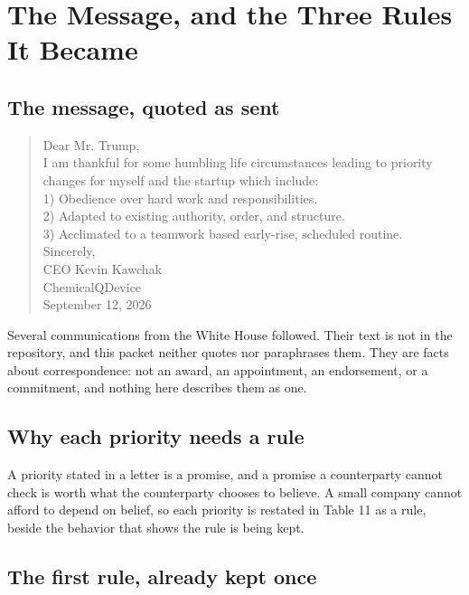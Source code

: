 \section{The Message, and the Three Rules It Became}

\subsection{The message, quoted as sent}

\begin{quote}\small
Dear Mr. Trump,\\[0.4em]
I am thankful for some humbling life circumstances leading to priority changes
for myself and the startup which include:\\
1) Obedience over hard work and responsibilities.\\
2) Adapted to existing authority, order, and structure.\\
3) Acclimated to a teamwork based early-rise, scheduled routine.\\[0.4em]
Sincerely,\\
CEO Kevin Kawchak\\
ChemicalQDevice\\
September 12, 2026
\end{quote}

Several communications from the White House followed. Their text is not in the
repository, and this packet neither quotes nor paraphrases them. They are facts
about correspondence: not an award, an appointment, an endorsement, or a
commitment, and nothing here describes them as one.

\subsection{Why each priority needs a rule}

A priority stated in a letter is a promise, and a promise a counterparty cannot
check is worth what the counterparty chooses to believe. A small company cannot
afford to depend on belief, so each priority is restated in Table 11 as a rule,
beside the behavior that shows the rule is being kept.

\subsection{The first rule, already kept once}

